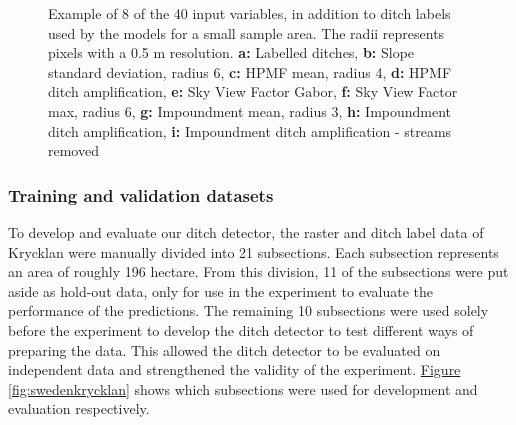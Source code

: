 \documentclass[]{interact}
\theoremstyle{plain}%
\theoremstyle{definition}
\theoremstyle{remark}
\begin{document}
\begin{figure} [!htb]
    \caption{Example of 8 of the 40 input variables, in addition to ditch labels used by the models for a small sample area. The radii represents pixels with a 0.5 m resolution. \newline \textbf{a:} Labelled ditches, \textbf{b:} Slope standard deviation, radius 6, \textbf{c:} HPMF mean, radius 4, \textbf{d:} HPMF ditch amplification, \textbf{e:} Sky View Factor Gabor, \textbf{f:} Sky View Factor max, radius 6, \textbf{g:} Impoundment mean, radius 3, \textbf{h:} Impoundment ditch amplification, \textbf{i:} Impoundment ditch amplification - streams removed}
    \label{fig:features}
\end{figure}

\subsubsection{Training and validation datasets}
\label{trainingvalidationdatasets}
To develop and evaluate our ditch detector, the raster and ditch label data of Krycklan were manually divided into 21 subsections. Each subsection represents an area of roughly 196 hectare. From this division, 11 of the subsections were put aside as hold-out data, only for use in the experiment to evaluate the performance of the predictions. The remaining 10 subsections were used solely before the experiment to develop the ditch detector to test different ways of preparing the data. This allowed the ditch detector to be evaluated on  independent data and  strengthened the validity of the experiment. \hyperref[fig:swedenkrycklan]{Figure} \ref{fig:swedenkrycklan} shows which subsections were used for development and evaluation respectively.
\end{document}
